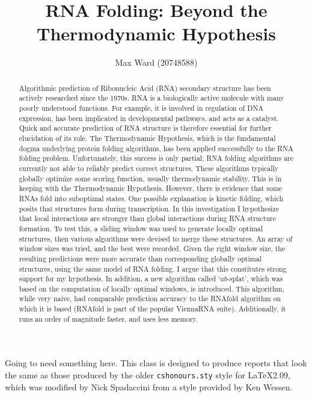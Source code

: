 \documentclass{cshonours}
\title{RNA Folding: Beyond the Thermodynamic Hypothesis}
\author{Max Ward (20748588)}
\begin{document}
\maketitle

\begin{abstract}
Algorithmic prediction of Ribonucleic Acid (RNA) secondary structure has been actively researched since the 1970s. RNA is a biologically active molecule with many poorly understood functions. For example, it is involved in regulation of DNA expression, has been implicated in developmental pathways, and acts as a catalyst. Quick and accurate prediction of RNA structure is therefore essential for further elucidation of its role. The Thermodynamic Hypothesis, which is the fundamental dogma underlying protein folding algorithms, has been applied successfully to the RNA folding problem. Unfortunately, this success is only partial; RNA folding algorithms are currently not able to reliably predict correct structures. These algorithms typically globally optimize some scoring function, usually thermodynamic stability. This is in keeping with the Thermodynamic Hypothesis. However, there is evidence that some RNAs fold into suboptimal states. One possible explanation is kinetic folding, which posits that structures form during transcription. In this investigation I hypothesize that local interactions are stronger than global interactions during RNA structure formation. To test this, a sliding window was used to generate locally optimal structures, then various algorithms were devised to merge these structures. An array of window sizes was tried, and the best were recorded. Given the right window size, the resulting predictions were more accurate than corresponding globally optimal structures, using the same model of RNA folding. I argue that this constitutes strong support for my hypothesis. In addition, a new algorithm called `$ab$-splat', which was based on the computation of locally optimal windows, is introduced. This algorithm, while very naive, had comparable prediction accuracy to the RNAfold algorithm on which it is based (RNAfold is part of the popular ViennaRNA suite). Additionally, it runs an order of magnitude faster, and uses less memory.
\end{abstract}

\begin{acknowledgements}
Going to need something here.
This class is designed to produce reports that look
the same as those produced by the older {\tt cshonours.sty} style for
\LaTeX 2.09, which was modified by Nick Spadaccini from a style
provided by Ken Wessen.
\end{acknowledgements}
\end{document}
